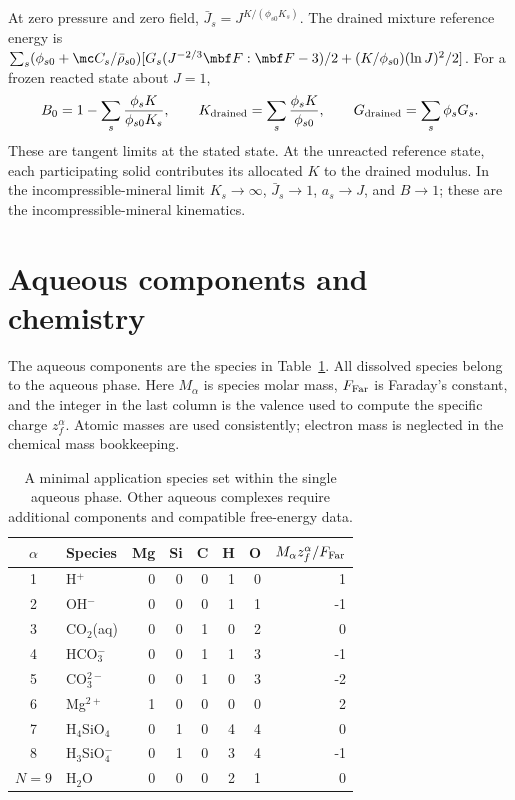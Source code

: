 \documentclass[11pt]{article}
\begin{document}
At zero pressure and zero field,
\(\bar J_s=J^{K/(\phi_{s0}K_s)}\).
The drained mixture reference energy is
\(\sum_s(\phi_{s0}+\mc C_s/\bar\rho_{s0})
[G_s(J^{-2/3}\mbf F:\mbf F-3)/2+(K/\phi_{s0})(\ln J)^2/2]\).
For a frozen reacted state about \(J=1\),
\begin{equation}
 B_0=1-\sum_s\frac{\phi_s K}{\phi_{s0}K_s},
 \qquad K_{\rm drained}=\sum_s\frac{\phi_s K}{\phi_{s0}},
 \qquad G_{\rm drained}=\sum_s\phi_s G_s.
 \label{eq:linear_limit}
\end{equation}
These are tangent limits at the stated state. At the unreacted reference state, each participating solid contributes its allocated \(K\) to the drained modulus. In the incompressible-mineral limit \(K_s\to\infty\), \(\bar J_s\to1\), \(a_s\to J\), and \(B\to1\); these are the incompressible-mineral kinematics.

\section{Aqueous components and chemistry}
\label{sec:chemistry}
The aqueous components are the species in Table~\ref{tab:species}. All dissolved species belong to the aqueous phase. Here \(M_\alpha\) is species molar mass, \(F_{\rm Far}\) is Faraday’s constant, and the integer in the last column is the valence used to compute the specific charge \(z_f^\alpha\). Atomic masses are used consistently; electron mass is neglected in the chemical mass bookkeeping.
\begin{table}[ht]
\centering
\begin{tabular}{clrrrrrr}
\toprule
\(\alpha\)& Species & Mg & Si & C & H & O &\(M_\alpha z_f^\alpha/F_{\rm Far}\)\\
\midrule
1&H\(^{+}\)&0&0&0&1&0&1\\
2&OH\(^{-}\)&0&0&0&1&1&-1\\
3&CO\(_2\)(aq)&0&0&1&0&2&0\\
4&HCO\(_3^{-}\)&0&0&1&1&3&-1\\
5&CO\(_3^{2-}\)&0&0&1&0&3&-2\\
6&Mg\(^{2+}\)&1&0&0&0&0&2\\
7&H\(_4\)SiO\(_4\)&0&1&0&4&4&0\\
8&H\(_3\)SiO\(_4^{-}\)&0&1&0&3&4&-1\\
\(N=9\)&H\(_2\)O&0&0&0&2&1&0\\
\bottomrule
\end{tabular}
\caption{A minimal application species set within the single aqueous phase. Other aqueous complexes require additional components and compatible free-energy data.}
\label{tab:species}
\end{table}
\end{document}
